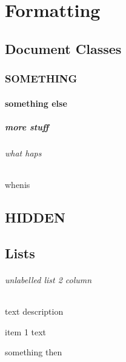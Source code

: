\documentclass{report} %
\begin{document}
	\tableofcontents
	
\part[Formatting]{Formatting}
\chapter{Document Classes}
\section{SOMETHING}
\subsection{something else}
\subsubsection{more stuff}
\paragraph{what haps}
\subparagraph{whenis}
	

\chapter*{HIDDEN}

\chapter{Lists}
\paragraph{unlabelled list 2 column}
	\begin{list}{}{}
		\item[text] description
		\item item 1 text
		\item[something] then
	\end{list}
\end{document}
